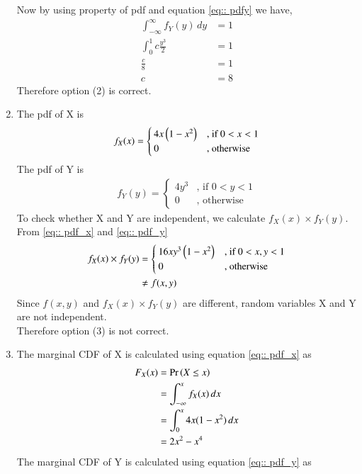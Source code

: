 \documentclass[journal,12pt,twocolumn]{IEEEtran}
\begin{document}
\begin{enumerate}
Now by using property of pdf  and equation \ref{eq:: pdfy} we have,
\begin{align}
    \int_{-\infty}^{\infty} f_Y(y) \,dy &= 1 \\
    \int_{0}^{1} c\frac{y^3}{2} & =1 \\
    \frac{c}{8} &= 1 \\
    c & = 8
\end{align}
Therefore option (2) is correct. \\
\item
The pdf of X is 
\begin{align}
\label{eq:: pdf_x}
f_X(x)  = 
\begin{cases}
4x \left(1- x^2\right) & \text{, if } 0<x<1
\\
0 & \text{, otherwise }
\end{cases}
\end{align} 
The pdf of Y is 
 \begin{align}
\label{eq:: pdf_y}
f_Y(y)  = 
\begin{cases}
 4y^3 & \text{, if } 0<y<1
\\
0 & \text{, otherwise }
\end{cases}
\end{align}   
To check whether X and Y are independent, we calculate $ f_X(x) \times f_Y(y)  $. From \ref{eq:: pdf_x} and \ref{eq:: pdf_y}
\begin{align}
f_X(x) \times f_Y(y) & = 
\begin{cases}
16xy^3 \left(1- x^2\right) & \text{, if } 0<x,y<1 
\\
0 & \text{, otherwise }
\end{cases}
\\
  &\neq f(x,y)
\end{align} 
Since $f(x,y) $ and $ f_X(x) \times f_Y(y) $ are different, random variables X and Y are not independent. \\ 
Therefore option (3) is not correct. \\
\item
The marginal CDF of X is calculated using equation \ref{eq:: pdf_x} as 
\begin{align}
  F_{X}(x) &= \Pr\left(X \le x\right) \\
  &=  \int_{-\infty}^{x} f_X(x)\,dx \\
  & =  \int_{0}^{x} 4x(1-x^2)\,dx\\
  &= 2x^2-x^4
\end{align}
The marginal CDF of Y is calculated using equation \ref{eq:: pdf_y} as 
\begin{align}

\end{align}
\end{enumerate}
\end{document}
